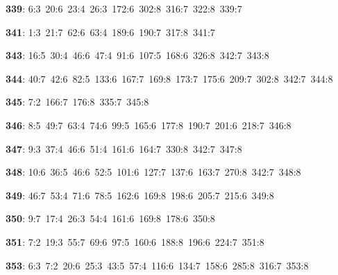 \noindent \textbf{339}: 6:3\allowbreak\ 20:6\allowbreak\ 23:4\allowbreak\ 26:3\allowbreak\ 172:6\allowbreak\ 302:8\allowbreak\ 316:7\allowbreak\ 322:8\allowbreak\ 339:7\par
\noindent \textbf{341}: 1:3\allowbreak\ 21:7\allowbreak\ 62:6\allowbreak\ 63:4\allowbreak\ 189:6\allowbreak\ 190:7\allowbreak\ 317:8\allowbreak\ 341:7\par
\noindent \textbf{343}: 16:5\allowbreak\ 30:4\allowbreak\ 46:6\allowbreak\ 47:4\allowbreak\ 91:6\allowbreak\ 107:5\allowbreak\ 168:6\allowbreak\ 326:8\allowbreak\ 342:7\allowbreak\ 343:8\par
\noindent \textbf{344}: 40:7\allowbreak\ 42:6\allowbreak\ 82:5\allowbreak\ 133:6\allowbreak\ 167:7\allowbreak\ 169:8\allowbreak\ 173:7\allowbreak\ 175:6\allowbreak\ 209:7\allowbreak\ 302:8\allowbreak\ 342:7\allowbreak\ 344:8\par
\noindent \textbf{345}: 7:2\allowbreak\ 166:7\allowbreak\ 176:8\allowbreak\ 335:7\allowbreak\ 345:8\par
\noindent \textbf{346}: 8:5\allowbreak\ 49:7\allowbreak\ 63:4\allowbreak\ 74:6\allowbreak\ 99:5\allowbreak\ 165:6\allowbreak\ 177:8\allowbreak\ 190:7\allowbreak\ 201:6\allowbreak\ 218:7\allowbreak\ 346:8\par
\noindent \textbf{347}: 9:3\allowbreak\ 37:4\allowbreak\ 46:6\allowbreak\ 51:4\allowbreak\ 161:6\allowbreak\ 164:7\allowbreak\ 330:8\allowbreak\ 342:7\allowbreak\ 347:8\par
\noindent \textbf{348}: 10:6\allowbreak\ 36:5\allowbreak\ 46:6\allowbreak\ 52:5\allowbreak\ 101:6\allowbreak\ 127:7\allowbreak\ 137:6\allowbreak\ 163:7\allowbreak\ 270:8\allowbreak\ 342:7\allowbreak\ 348:8\par
\noindent \textbf{349}: 46:7\allowbreak\ 53:4\allowbreak\ 71:6\allowbreak\ 78:5\allowbreak\ 162:6\allowbreak\ 169:8\allowbreak\ 198:6\allowbreak\ 205:7\allowbreak\ 215:6\allowbreak\ 349:8\par
\noindent \textbf{350}: 9:7\allowbreak\ 17:4\allowbreak\ 26:3\allowbreak\ 54:4\allowbreak\ 161:6\allowbreak\ 169:8\allowbreak\ 178:6\allowbreak\ 350:8\par
\noindent \textbf{351}: 7:2\allowbreak\ 19:3\allowbreak\ 55:7\allowbreak\ 69:6\allowbreak\ 97:5\allowbreak\ 160:6\allowbreak\ 188:8\allowbreak\ 196:6\allowbreak\ 224:7\allowbreak\ 351:8\par
\noindent \textbf{353}: 6:3\allowbreak\ 7:2\allowbreak\ 20:6\allowbreak\ 25:3\allowbreak\ 43:5\allowbreak\ 57:4\allowbreak\ 116:6\allowbreak\ 134:7\allowbreak\ 158:6\allowbreak\ 285:8\allowbreak\ 316:7\allowbreak\ 353:8\par
